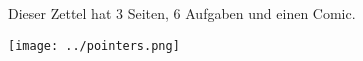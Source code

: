 \documentclass{../uebungszettel}
\begin{document}
\noindent
Dieser Zettel hat $3$ Seiten, $6$ Aufgaben und einen Comic. 










\center
\texttt{[image: ../pointers.png]}





\end{document}
